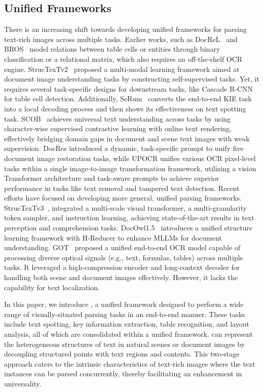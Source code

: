 \subsection{Unified Frameworks}
There is an increasing shift towards developing unified frameworks for parsing text-rich images across multiple tasks. Earlier works, such as DocReL~\cite{li2022relational} and BROS~\cite{hong2022bros} model relations between table cells or entities through binary classification or a relational matrix, which also requires an off-the-shelf OCR engine.
StrucTexTv2~\cite{yu2022structextv2} proposed a multi-modal learning framework aimed at document image understanding tasks by constructing self-supervised tasks. Yet, it requires several task-specific designs for downstream tasks, like Cascade R-CNN for table cell detection. Additionally, SeRum~\cite{cao2023attention} converts the end-to-end KIE task into a local decoding process and then shows its effectiveness on text spotting task. SCOB~\cite{kim2023scob} achieves universal text understanding across tasks by using character-wise supervised contrastive learning with online text rendering, effectively bridging domain gaps in document and scene text images with weak supervision. DocRes\cite{Zhang2024DocResAG} introduced a dynamic, task-specific prompt to unify five document image restoration tasks, while UPOCR\cite{Peng2023UPOCRTU} unifies various OCR pixel-level tasks within a single image-to-image transformation framework, utilizing a vision Transformer architecture and task-aware prompts to achieve superior performance in tasks like text removal and tampered text detection. Recent efforts have focused on developing more general, unified parsing frameworks. StrucTexTv3~\cite{Lyu2024StrucTexTv3AE}, integrated a multi-scale visual transformer, a multi-granularity token sampler, and instruction learning, achieving state-of-the-art results in text perception and comprehension tasks. DocOwl1.5~\cite{Hu2024mPLUGDocOwl1U} introduces a unified structure learning framework with H-Reducer to enhance MLLMs for document understanding. GOT~\cite{wei2024general} proposed a unified end-to-end OCR model capable of processing diverse optical signals (e.g., text, formulas, tables) across multiple tasks. It leveraged a high-compression encoder and long-context decoder for handling both scene and document images effectively. However, it lacks the capability for text localization.


In this paper, we introduce \ourmodel, a unified framework designed to perform a wide range of visually-situated parsing tasks in an end-to-end manner. These tasks include text spotting, key information extraction, table recognition, and layout analysis, all of which are consolidated within a unified framework. 
\ourmodel can represent the heterogeneous structures of text in natural scenes or document images by decoupling structured points with text regions and contents. 
This two-stage approach caters to the intrinsic characteristics of text-rich images where the text instances can be parsed concurrently, thereby facilitating an enhancement in universality.


